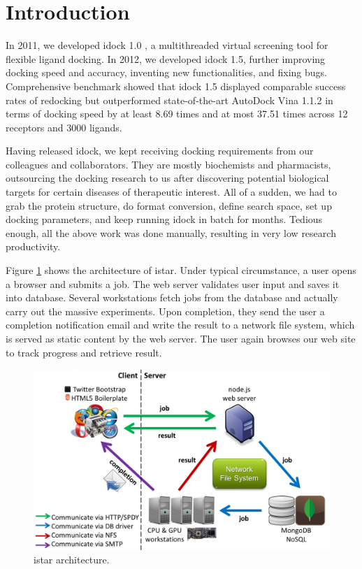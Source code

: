 \documentclass{bioinfo}
\begin{document}
\section{Introduction}

In 2011, we developed idock 1.0 \citep{1153}, a multithreaded virtual screening tool for flexible ligand docking. In 2012, we developed idock 1.5, further improving docking speed and accuracy, inventing new functionalities, and fixing bugs. Comprehensive benchmark showed that idock 1.5 displayed comparable success rates of redocking but outperformed state-of-the-art AutoDock Vina 1.1.2 \citep{595} in terms of docking speed by at least 8.69 times and at most 37.51 times across 12 receptors and 3000 ligands.

Having released idock, we kept receiving docking requirements from our colleagues and collaborators. They are mostly biochemists and pharmacists, outsourcing the docking research to us after discovering potential biological targets for certain diseases of therapeutic interest. All of a sudden, we had to grab the protein structure, do format conversion, define search space, set up docking parameters, and keep running idock in batch for months. Tedious enough, all the above work was done manually, resulting in very low research productivity.

Figure \ref{istar:architecture} shows the architecture of istar. Under typical circumstance, a user opens a browser and submits a job. The web server validates user input and saves it into database. Several workstations fetch jobs from the database and actually carry out the massive experiments. Upon completion, they send the user a completion notification email and write the result to a network file system, which is served as static content by the web server. The user again browses our web site to track progress and retrieve result.

\begin{figure}
\centerline{\includegraphics[width=\linewidth]{architecture.png}}
\caption{istar architecture.}\label{istar:architecture}
\end{figure}
\end{document}
